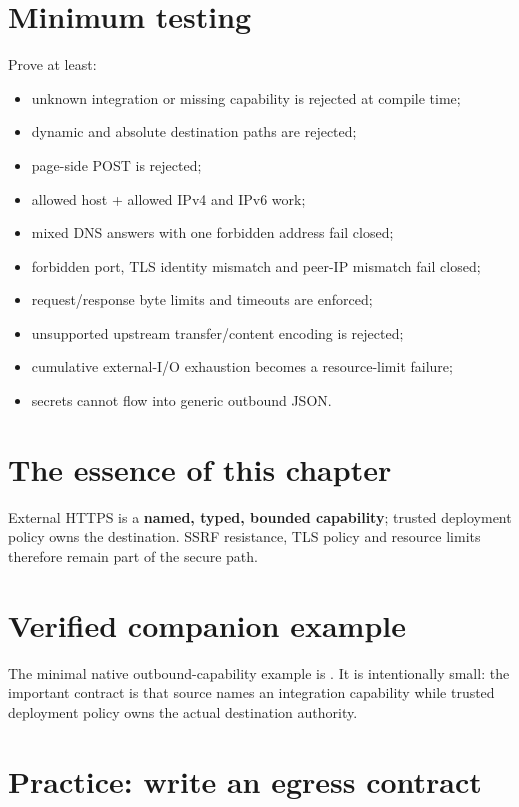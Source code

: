 \section{Minimum testing}

Prove at least:

\begin{itemize}
  \item unknown integration or missing  capability is rejected at compile time;
  \item dynamic and absolute destination paths are rejected;
  \item page-side POST is rejected;
  \item allowed host + allowed IPv4 and IPv6 work;
  \item mixed DNS answers with one forbidden address fail closed;
  \item forbidden port, TLS identity mismatch and peer-IP mismatch fail closed;
  \item request/response byte limits and timeouts are enforced;
  \item unsupported upstream transfer/content encoding is rejected;
  \item cumulative external-I/O exhaustion becomes a resource-limit failure;
  \item secrets cannot flow into generic outbound JSON.
\end{itemize}

\section{The essence of this chapter}

External HTTPS is a \textbf{named, typed, bounded capability}; trusted deployment policy owns the destination. SSRF resistance, TLS policy and resource limits therefore remain part of the secure path.

\section{Verified companion example}
The minimal native outbound-capability example is . It is intentionally small: the important contract is that source names an integration capability while trusted deployment policy owns the actual destination authority.

\section{Practice: write an egress contract}

